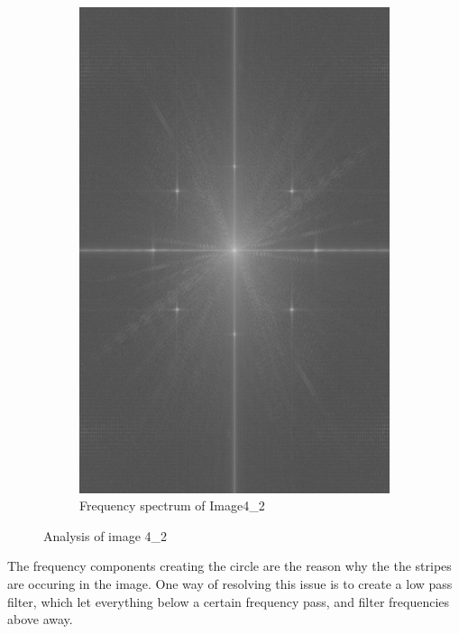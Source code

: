 \begin{figure}[H]
\begin{subfigure}[b]{0.23\textwidth}
        \label{fig:img42_src}
    \end{subfigure}
    \begin{subfigure}[b]{0.23\textwidth}
        \includegraphics[width=\textwidth]{img4/Image4_2_freq_spec.png}
        \caption{Frequency spectrum of Image4\_2}
        \label{fig:img1_hist}
    \end{subfigure}
    \caption{Analysis of image 4\_2}\label{fig:img1}
\end{figure}

The frequency components creating the circle are the reason why the the stripes are occuring in the image.  One way of resolving this issue is to create a low pass filter, which let everything below a certain frequency pass, and  filter frequencies above away. \\

